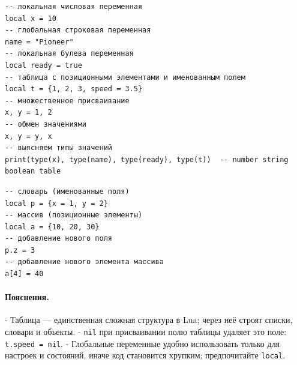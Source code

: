 \begin{verbatim}
-- локальная числовая переменная
local x = 10
-- глобальная строковая переменная
name = "Pioneer"
-- локальная булева переменная
local ready = true
-- таблица с позиционными элементами и именованным полем
local t = {1, 2, 3, speed = 3.5}
-- множественное присваивание
x, y = 1, 2
-- обмен значениями
x, y = y, x
-- выясняем типы значений
print(type(x), type(name), type(ready), type(t))  -- number string boolean table
\end{verbatim}
\begin{verbatim}
-- словарь (именованные поля)
local p = {x = 1, y = 2}
-- массив (позиционные элементы)
local a = {10, 20, 30}
-- добавление нового поля
p.z = 3
-- добавление нового элемента массива
a[4] = 40
\end{verbatim}
\paragraph{Пояснения.}
- Таблица — единственная сложная структура в Lua; через неё строят списки, словари и объекты.
- \verb|nil| при присваивании полю таблицы удаляет это поле: \verb|t.speed = nil|.
- Глобальные переменные удобно использовать только для настроек и состояний, иначе код становится хрупким; предпочитайте \verb|local|.


